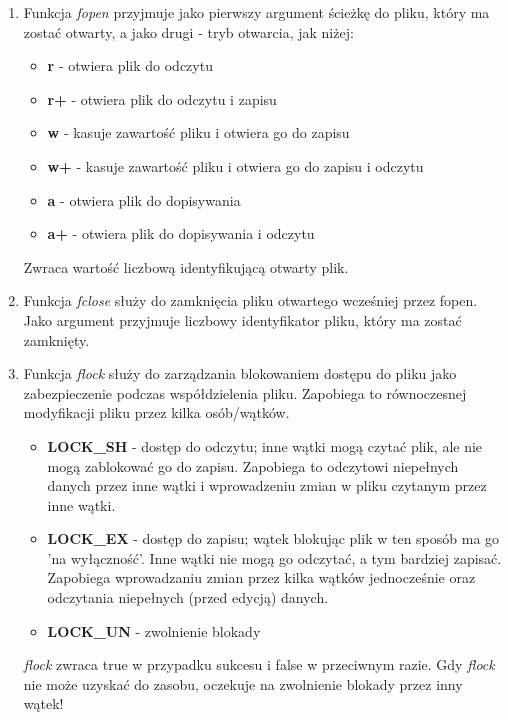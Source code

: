 \begin{enumerate}
\item 
Funkcja \textit{fopen} przyjmuje jako pierwszy argument ścieżkę do pliku, który ma zostać otwarty, a jako drugi - tryb otwarcia, jak niżej:
\begin{itemize}
\item
\textbf{r} - otwiera plik do odczytu
\item
\textbf{r+} - otwiera plik do odczytu i zapisu
\item
\textbf{w} - kasuje zawartość pliku i otwiera go do zapisu
\item
\textbf{w+} - kasuje zawartość pliku i otwiera go do zapisu i odczytu
\item
\textbf{a} - otwiera plik do dopisywania
\item
\textbf{a+} - otwiera plik do dopisywania i odczytu
\end{itemize}
Zwraca wartość liczbową identyfikującą otwarty plik.
\item
Funkcja \textit{fclose} służy do zamknięcia pliku otwartego wcześniej przez fopen. Jako argument przyjmuje liczbowy identyfikator pliku, który ma zostać zamknięty.
\item
Funkcja \textit{flock} służy do zarządzania blokowaniem dostępu do pliku jako zabezpieczenie podczas współdzielenia pliku. Zapobiega to równoczesnej modyfikacji pliku przez kilka osób/wątków.
\begin{itemize}
\item
\textbf{LOCK\_SH} - dostęp do odczytu; inne wątki mogą czytać plik, ale nie mogą zablokować go do zapisu. Zapobiega to odczytowi niepełnych danych przez inne wątki i wprowadzeniu zmian w pliku czytanym przez inne wątki.
\item
\textbf{LOCK\_EX} - dostęp do zapisu; wątek blokując plik w ten sposób ma go 'na wyłączność'. Inne wątki nie mogą go odczytać, a tym bardziej zapisać. Zapobiega wprowadzaniu zmian przez kilka wątków jednocześnie oraz odczytania niepełnych (przed edycją) danych.
\item
\textbf{LOCK\_UN} - zwolnienie blokady 
\end{itemize}
\textit{flock} zwraca true w przypadku sukcesu i false w przeciwnym razie.
Gdy \textit{flock} nie może uzyskać do zasobu, oczekuje na zwolnienie blokady przez inny wątek!
\end{enumerate}


